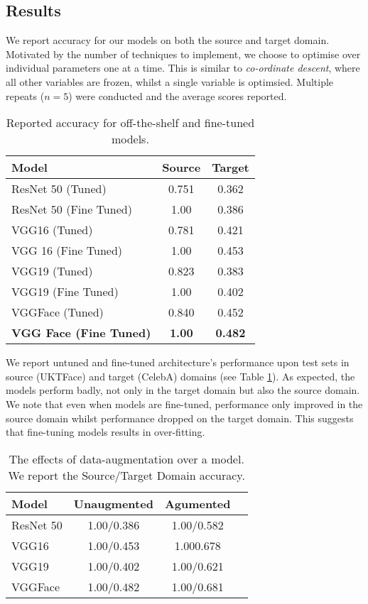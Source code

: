 \documentclass[10pt,twocolumn,letterpaper]{article}
\begin{document}
\subsection{Results}
We report accuracy for our models on both the source and target domain. Motivated by the number of techniques to implement, we choose to optimise over individual parameters one at a time. This is similar to \textit{co-ordinate descent}, where all other variables are frozen, whilst a single variable is optimsied. Multiple repeats ($n=5$) were conducted and the average scores reported.
\begin{table}[h!]
\begin{center}
\begin{tabular}{|l|c|c|}
\hline
Model & Source & Target \\\hline\hline
ResNet 50 (Tuned)&  0.751& 0.362\\
ResNet 50 (Fine Tuned) & 1.00 & 0.386\\ \hline
VGG16 (Tuned) & 0.781& 0.421\\
VGG 16 (Fine Tuned) & 1.00 & 0.453\\ \hline
VGG19 (Tuned) &0.823& 0.383\\
VGG19 (Fine Tuned) &1.00 & 0.402\\ \hline
VGGFace (Tuned)&0.840 & 0.452\\
\textbf{VGG Face (Fine Tuned)}& \textbf{1.00} & \textbf{0.482}\\ 
\hline
\end{tabular}
\end{center}
\caption{Reported accuracy for off-the-shelf and fine-tuned models. \label{finetuned}}
\end{table}

We report untuned and fine-tuned architecture's performance upon test sets in source (UKTFace) and target (CelebA) domains (see Table \ref{finetuned}). As expected, the models perform badly, not only in the target domain but also the source domain. We note that even when models are fine-tuned, performance only improved in the source domain whilst performance dropped on the target domain. This suggests that fine-tuning models results in over-fitting.

\begin{table}[h!]
\begin{center}
\begin{tabular}{|l|c|c|c|}
\hline
Model & Unaugmented & Agumented  \\
\hline\hline
ResNet 50 &1.00/0.386  & 1.00/0.582\\
VGG16 & 1.00/0.453 & 1.000.678\\
VGG19  &1.00/0.402 & 1.00/0.621\\
VGGFace & 1.00/0.482 & 1.00/0.681\\
\hline
\end{tabular}
\end{center}
\caption{The effects of data-augmentation over a model. We report the Source/Target Domain accuracy. \label{data agument}}
\end{table}
\end{document}
